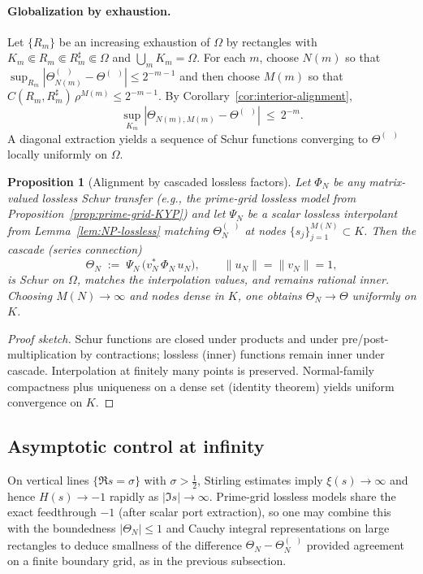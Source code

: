 \documentclass[11pt]{article}
\newtheorem{proposition}[theorem]{Proposition}
\theoremstyle{remark}
\DeclareMathOperator{\dettwo}{det_2}
\begin{document}
\paragraph{Globalization by exhaustion.}
Let \(\{R_m\}\) be an increasing exhaustion of \(\Omega\) by rectangles with \(K_m\Subset R_m\Subset R_m^\sharp\Subset\Omega\) and \(\bigcup_m K_m=\Omega\). For each \(m\), choose \(N(m)\) so that \(\sup_{R_m}|\Theta_{N(m)}^{(\dettwo)}-\Theta^{(\dettwo)}|\le 2^{-m-1}\) and then choose \(M(m)\) so that \(C(R_m,R_m^\sharp)\,\rho^{M(m)}\le 2^{-m-1}\). By Corollary~\ref{cor:interior-alignment},
\[
 \sup_{K_m}|\Theta_{N(m),M(m)}-\Theta^{(\dettwo)}|\ \le\ 2^{-m}.
\]
A diagonal extraction yields a sequence of Schur functions converging to \(\Theta^{(\dettwo)}\) locally uniformly on \(\Omega\).
\begin{proposition}[Alignment by cascaded lossless factors]\label{prop:cascade}
Let \(\Phi_N\) be any matrix-valued lossless Schur transfer (e.g., the prime-grid lossless model from Proposition~\ref{prop:prime-grid-KYP}) and let \(\Psi_N\) be a scalar lossless interpolant from Lemma~\ref{lem:NP-lossless} matching \(\Theta_N^{(\dettwo)}\) at nodes \(\{s_j\}_{j=1}^{M(N)}\subset K\). Then the cascade (series connection)
\[
 \Theta_N\;:=\;\Psi_N\,\big(v_N^*\,\Phi_N\,u_N\big),\qquad \|u_N\|=\|v_N\|=1,
\]
is Schur on \(\Omega\), matches the interpolation values, and remains rational inner. Choosing \(M(N)\to\infty\) and nodes dense in \(K\), one obtains \(\Theta_N\to \Theta\) uniformly on \(K\).
\end{proposition}
\begin{proof}[Proof sketch]
Schur functions are closed under products and under pre/post-multiplication by contractions; lossless (inner) functions remain inner under cascade. Interpolation at finitely many points is preserved. Normal-family compactness plus uniqueness on a dense set (identity theorem) yields uniform convergence on \(K\).
\end{proof}

\subsection{Asymptotic control at infinity}
On vertical lines \(\{\Re s=\sigma\}\) with \(\sigma>\tfrac12\), Stirling estimates imply \(\xi(s)\to\infty\) and hence \(H(s)\to -1\) rapidly as \(|\Im s|\to\infty\). Prime-grid lossless models share the exact feedthrough \(-1\) (after scalar port extraction), so one may combine this with the boundedness \(|\Theta_N|\le 1\) and Cauchy integral representations on large rectangles to deduce smallness of the difference \(\Theta_N-\Theta_N^{(\dettwo)}\) provided agreement on a finite boundary grid, as in the previous subsection.
\end{document}
